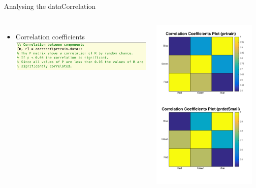 \documentclass{beamer}
\begin{document}
\begin{frame}{Analysing the data}{Correlation}
    \begin{columns}
    \begin{itemize}
        \item Correlation coefficients
        \includegraphics[scale=0.3]{correlation.png}
    \end{itemize}
        \includegraphics[scale=0.2]{CCplot.png}
    \end{columns}
\end{frame}
\end{document}
